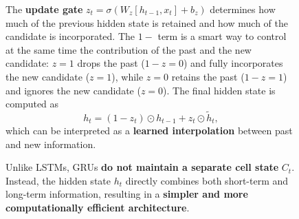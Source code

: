 \begin{figure}[!htp]
{        \highspace
        The \textbf{update gate} $z_t = \sigma(W_z [h_{t-1}, x_t] + b_z)$ determines how much of the previous hidden state is retained and how much of the candidate is incorporated. The $1-$ term is a smart way to control at the same time the contribution of the past and the new candidate: $z=1$ drops the past ($1-z=0$) and fully incorporates the new candidate ($z=1$), while $z=0$ retains the past ($1-z=1$) and ignores the new candidate ($z=0$). The final hidden state is computed as
        \begin{equation*}
        h_t = (1 - z_t)\odot h_{t-1} + z_t \odot \tilde{h}_t,
        \end{equation*}
        which can be interpreted as a \textbf{learned interpolation} between past and new information.

        \highspace
        Unlike LSTMs, GRUs \textbf{do not maintain a separate cell state} $C_t$. Instead, the hidden state $h_t$ directly combines both short-term and long-term information, resulting in a \textbf{simpler and more computationally efficient architecture}.
    }
    \label{fig:gru}
\end{figure}